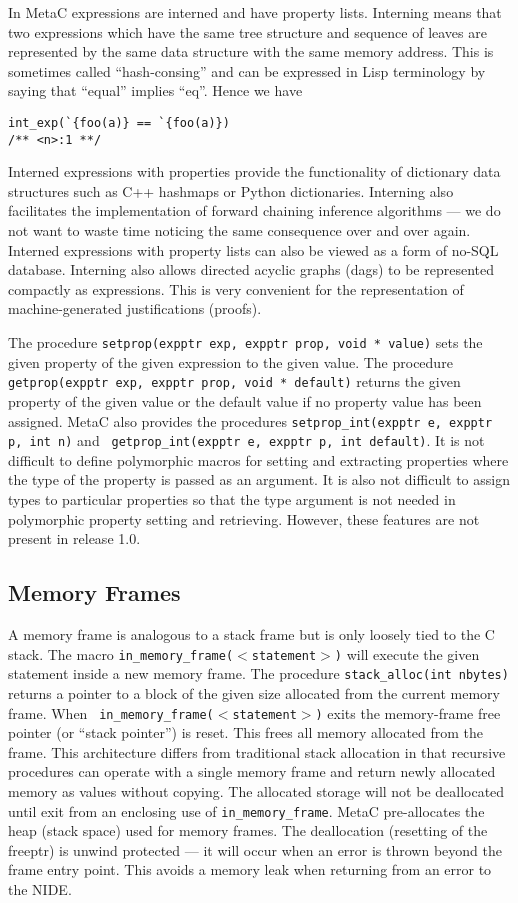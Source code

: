 \documentclass{article}
\begin{document}
In MetaC expressions are interned and have property lists.
Interning means that two expressions which have the same tree structure and sequence of leaves are represented by the same data structure with the same memory address.
This is sometimes called ``hash-consing'' and can be expressed in Lisp terminology by saying that ``equal'' implies ``eq''.
Hence we have
\begin{verbatim}
int_exp(`{foo(a)} == `{foo(a)})
/** <n>:1 **/
\end{verbatim}
Interned expressions with properties provide the functionality of dictionary data structures such as C++ hashmaps or Python dictionaries.
Interning also facilitates the implementation of forward chaining inference algorithms --- we do not want to waste time noticing the same
consequence over and over again.  Interned expressions with property lists can also be viewed as a form of no-SQL database.
Interning also allows directed acyclic graphs (dags) to be represented compactly as expressions.  This is very convenient
for the representation of machine-generated justifications (proofs).

The procedure {\tt setprop(expptr exp, expptr prop, void * value)}
sets the given property of the given expression to the given value.
The procedure {\tt getprop(expptr exp, expptr prop, void * default)}
returns the given property of the given value or the default value if
no property value has been assigned.  MetaC also provides the
procedures {\tt setprop\_int(expptr e, expptr p, int n)} and {\tt
  getprop\_int(expptr e, expptr p, int default)}.  It is not difficult
to define polymorphic macros for setting and extracting properties
where the type of the property is passed as an argument.  It is also
not difficult to assign types to particular properties so that the
type argument is not needed in polymorphic property setting and
retrieving.  However, these features are not present in release 1.0.

\subsection{Memory Frames}
\label{sec:memory}

A memory frame is analogous to a stack frame but is only loosely tied
to the C stack.  The macro {\tt in\_memory\_frame($<$statement$>$)}
will execute the given statement inside a new memory frame.  The
procedure {\tt stack\_alloc(int nbytes)} returns a pointer to a block
of the given size allocated from the current memory frame. When {\tt
  in\_memory\_frame($<$statement$>$)} exits the memory-frame free
pointer (or ``stack pointer'') is reset.  This frees all memory
allocated from the frame.  This architecture differs from traditional
stack allocation in that recursive procedures can operate with a
single memory frame and return newly allocated memory as values
without copying.  The allocated storage will not be deallocated until
exit from an enclosing use of {\tt in\_memory\_frame}.  MetaC
pre-allocates the heap (stack space) used for memory frames.  The
deallocation (resetting of the freeptr) is unwind protected --- it
will occur when an error is thrown beyond the frame entry point.  This
avoids a memory leak when returning from an error to the NIDE.
\end{document}
